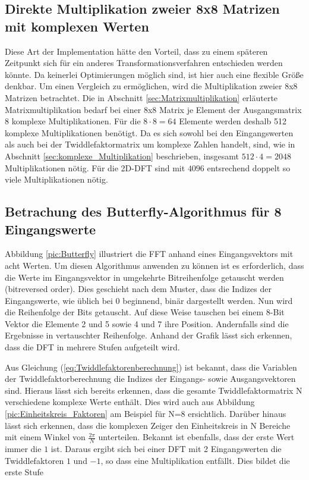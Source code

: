 \subsection{Direkte Multiplikation zweier 8x8 Matrizen mit komplexen Werten}
Diese Art der Implementation hätte den Vorteil, dass zu einem späteren Zeitpunkt sich für ein anderes
Transformationsverfahren entschieden werden könnte. Da keinerlei Optimierungen möglich sind, ist hier auch eine flexible Größe denkbar. Um einen Vergleich
zu ermöglichen, wird die Multiplikation zweier 8x8 Matrizen betrachtet.
Die in Abschnitt \ref{sec:Matrixmultiplikation} erläuterte Matrixmultiplikation bedarf bei einer 8x8 Matrix je Element der Ausgangsmatrix 8 komplexe Multiplikationen. Für
die $8\cdot8=64$ Elemente werden deshalb 512 komplexe Multiplikationen benötigt. Da es sich sowohl bei den Eingangswerten als auch bei der Twiddlefaktormatrix um komplexe
Zahlen handelt, sind, wie in Abschnitt \ref{sec:komplexe_Multiplikation} beschrieben, insgesamt $512\cdot4=2048$ Multiplikationen nötig.
Für die 2D-DFT sind mit $4096$ entsrechend doppelt so viele Multiplikationen nötig.



\subsection{Betrachung des Butterfly-Algorithmus für 8 Eingangswerte} 
Abbildung \ref{pic:Butterfly} illustriert die FFT anhand eines Eingangsvektors mit acht Werten. 
Um diesen Algorithmus anwenden zu können ist es erforderlich, dass die Werte im Eingangsvektor in umgekehrte Bitreihenfolge getauscht werden (bitreversed order).
Dies geschieht nach dem Muster, dass die Indizes der Eingangswerte, wie
üblich bei 0 beginnend, binär dargestellt werden. Nun wird die Reihenfolge der Bits getauscht. Auf diese Weise tauschen bei einem 8-Bit Vektor die
Elemente 2 und 5 sowie 4 und 7 ihre Position. Andernfalls sind die Ergebnisse in vertauschter Reihenfolge.
Anhand der Grafik lässt sich erkennen, dass die DFT in mehrere Stufen aufgeteilt wird.

Aus Gleichung (\ref{eq:Twiddlefaktorenberechnung}) ist 
bekannt, dass die Variablen der Twiddlefaktorberechnung die Indizes der Eingangs- sowie Ausgangsvektoren sind. Hieraus lässt sich bereits erkennen, dass
die gesamte Twiddlefaktormatrix N verschiedene komplexe Werte enthält. Dies wird auch aus Abbildung \ref{pic:Einheitskreis_Faktoren} am Beispiel für N=8 ersichtlich. 
Darüber hinaus lässt sich erkennen, dass die komplexen Zeiger den Einheitskreis 
in N Bereiche mit einem Winkel von $\frac{2 \pi}{N}$ unterteilen. Bekannt ist ebenfalls, dass der erste Wert immer die $1$ ist.
Daraus ergibt sich bei einer DFT mit 2 Eingangswerten die Twiddlefaktoren $1$ und $-1$, so dass eine Multiplikation entfällt. Dies bildet die erste Stufe

